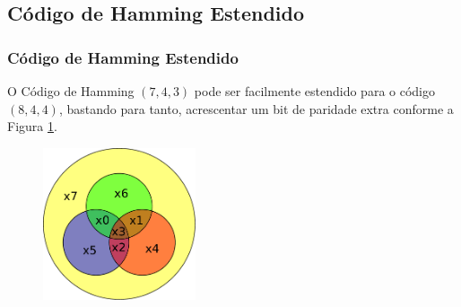 \subsection{Código de Hamming Estendido}
\begin{frame}[allowframebreaks]
  \frametitle{Código de Hamming Estendido}

  O Código de Hamming $(7,4,3)$ pode ser facilmente estendido 
  para o código $(8,4,4)$, bastando para tanto, acrescentar um 
  bit de paridade extra conforme a Figura \ref{fig:hamming84}.

                \begin{figure}[h!]
                \centering
                \includegraphics[width=0.4\textwidth]{images/hamming84.pdf}
                \label{fig:hamming84}
                \end{figure}


\end{frame}
